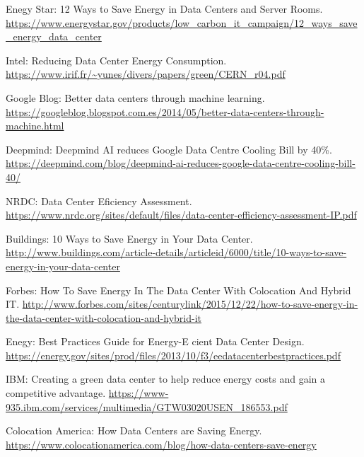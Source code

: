 \documentclass[10pt]{article}
\begin{document}
  \begin{thebibliography}{9}

		Enegy Star: 12 Ways to Save Energy in Data Centers and Server Rooms. \newline \url{https://www.energystar.gov/products/low_carbon_it_campaign/12_ways_save_energy_data_center}

    Intel: Reducing Data Center Energy Consumption. \newline
 		\url{https://www.irif.fr/~yunes/divers/papers/green/CERN_r04.pdf}

    Google Blog: Better data centers through machine learning. \newline
		\url{https://googleblog.blogspot.com.es/2014/05/better-data-centers-through-machine.html}

    Deepmind: Deepmind AI reduces Google Data Centre Cooling Bill by 40\%. \newline
		\url{https://deepmind.com/blog/deepmind-ai-reduces-google-data-centre-cooling-bill-40/}

    NRDC: Data Center Eficiency Assessment. \newline
 		\url{https://www.nrdc.org/sites/default/files/data-center-efficiency-assessment-IP.pdf}

    Buildings: 10 Ways to Save Energy in Your Data Center. \newline \url{http://www.buildings.com/article-details/articleid/6000/title/10-ways-to-save-energy-in-your-data-center}

		Forbes: How To Save Energy In The Data Center With Colocation And Hybrid IT. \newline \url{http://www.forbes.com/sites/centurylink/2015/12/22/how-to-save-energy-in-the-data-center-with-colocation-and-hybrid-it}

		Enegy: Best Practices Guide for Energy-E cient Data Center Design. \newline
		\url{https://energy.gov/sites/prod/files/2013/10/f3/eedatacenterbestpractices.pdf}

		IBM: Creating a green data center to help reduce energy costs and gain a competitive advantage. \newline
		\url{https://www-935.ibm.com/services/multimedia/GTW03020USEN_186553.pdf}

		Colocation America: How Data Centers are Saving Energy. \newline
		\url{https://www.colocationamerica.com/blog/how-data-centers-save-energy}


	\end{thebibliography}
\end{document}
